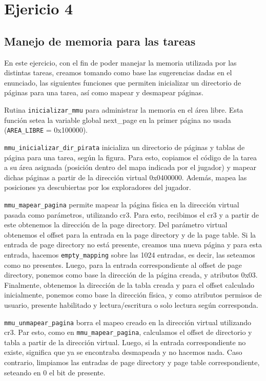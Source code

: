 \section{Ejericio 4}

\subsection{Manejo de memoria para las tareas}

En este ejercicio, con el fin de poder manejar la memoria utilizada por las distintas tareas, creamos tomando como base las sugerencias dadas en el enunciado, las siguientes funciones que permiten inicializar un directorio de páginas para una tarea, así como mapear y desmapear páginas.

Rutina \texttt{inicializar\_mmu} para administrar la memoria en el área libre. Esta función setea la variable global next\_page en la primer página no usada (\texttt{AREA\_LIBRE} = 0x100000).

\texttt{mmu\_inicializar\_dir\_pirata} inicializa un directorio de páginas y tablas de página para una tarea, según la figura. Para esto, copiamos el código de la tarea a su área asignada (posición dentro del mapa indicada por el jugador) y mapear dichas páginas a partir de la dirección virtual 0x0400000. Además, mapea las posiciones ya descubiertas por los exploradores del jugador.

\texttt{mmu\_mapear\_pagina} permite mapear la página física en la dirección virtual pasada como parámetros, utilizando cr3. Para esto, recibimos el cr3 y a partir de este obtenemos la dirección de la page directory. Del parámetro virtual obtenemos el offset para la entrada en la page directory y de la page table. Si la entrada de page directory no está presente, creamos una nueva página y para esta entrada, hacemos \texttt{empty\_mapping} sobre las 1024 entradas, es decir, las seteamos como no presentes.
Luego, para la entrada correspondiente al offset de page directory, ponemos como base la dirección de la página creada, y atributos 0x03. 
Finalmente, obtenemos la dirección de la tabla creada y para el offset calculado inicialmente, ponemos como base la dirección física, y como atributos permisos de usuario, presente habilitado y lectura/escritura o solo lectura según corresponda.

\texttt{mmu\_unmapear\_pagina} borra el mapeo creado en la dirección virtual utilizando cr3. Par esto, como en \texttt{mmu\_mapear\_pagina}, calculamos el offset de directorio y tabla a partir de la dirección virtual. Luego, si la entrada correspondiente no existe, significa que ya se encontraba desmapeada y no hacemos nada. Caso contrario, limpiamos las entradas de page directory y page table correspondiente, seteando en 0 el bit de presente.
